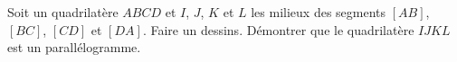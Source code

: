 
\begin{exercice}\label{exosmath-0085}

    Soit un quadrilatère \( ABCD\) et \( I\), \( J\), \( K\) et \( L\) les milieux des segments \( [AB]\), \( [BC]\), \( [CD]\) et \( [DA]\). Faire un dessins. Démontrer que le quadrilatère \( IJKL\) est un parallélogramme.

\end{exercice}
